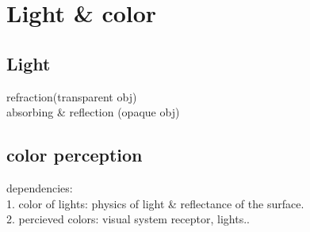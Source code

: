 \section{Light \& color}
\subsection*{Light}
refraction(transparent obj) \\
absorbing \& reflection (opaque obj)
\subsection*{color perception}
dependencies: \\
1. color of lights: physics of light \& reflectance of the surface. \\
2. percieved colors: visual system receptor, lights..

